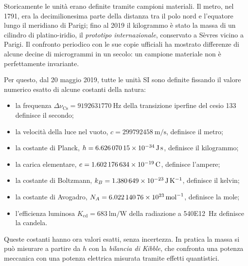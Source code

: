 Storicamente le unità erano definite tramite campioni materiali. Il metro, nel 1791, era la decimilionesima parte della distanza tra il polo nord e l'equatore lungo il meridiano di Parigi; fino al 2019 il kilogrammo è stato la massa di un cilindro di platino-iridio, il \emph{prototipo internazionale}, conservato a Sèvres vicino a Parigi. Il confronto periodico con le sue copie ufficiali ha mostrato differenze di alcune decine di microgrammi in un secolo: un campione materiale non è perfettamente invariante.

Per questo, dal 20 maggio 2019, tutte le unità SI sono definite fissando il valore numerico esatto di alcune costanti della natura:
\begin{itemize}
  \item la frequenza $\Delta\nu_\text{Cs}=\SI{9192631770}{\hertz}$ della transizione iperfine del cesio 133 definisce il secondo;
  \item la velocità della luce nel vuoto, $c=\SI{299792458}{\meter\per\second}$, definisce il metro;
  \item la costante di Planck, $h=\SI{6.62607015E-34}{\joule\second}$, definisce il kilogrammo;
  \item la carica elementare, $e=\SI{1.602176634E-19}{\coulomb}$, definisce l'ampere;
  \item la costante di Boltzmann, $k_B=\SI{1.380649E-23}{\joule\per\kelvin}$, definisce il kelvin;
  \item la costante di Avogadro, $N_A=\SI{6.02214076E23}{\per\mole}$, definisce la mole;
  \item l'efficienza luminosa $K_\text{cd}=\SI{683}{\lumen\per\watt}$ della radiazione a \SI{540E12}{\hertz} definisce la candela.
\end{itemize}
Queste costanti hanno ora valori esatti, senza incertezza. In pratica la massa si può misurare a partire da $h$ con la \emph{bilancia di Kibble}, che confronta una potenza meccanica con una potenza elettrica misurata tramite effetti quantistici.

